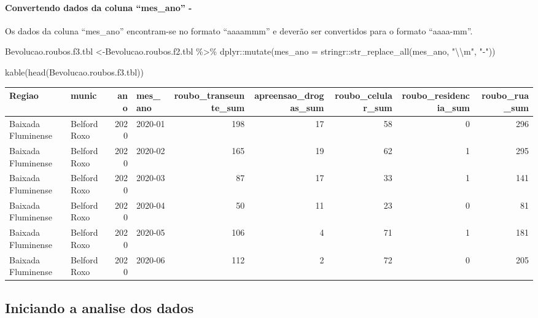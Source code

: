 \documentclass[
]{article}
\newenvironment{Shaded}{\begin{snugshade}}{\end{snugshade}}
\newcommand{\AttributeTok}[1]{\textcolor[rgb]{0.77,0.63,0.00}{#1}}
\newcommand{\FunctionTok}[1]{\textcolor[rgb]{0.00,0.00,0.00}{#1}}
\newcommand{\NormalTok}[1]{#1}
\newcommand{\OtherTok}[1]{\textcolor[rgb]{0.56,0.35,0.01}{#1}}
\newcommand{\SpecialCharTok}[1]{\textcolor[rgb]{0.00,0.00,0.00}{#1}}
\newcommand{\StringTok}[1]{\textcolor[rgb]{0.31,0.60,0.02}{#1}}
\begin{document}
\hypertarget{convertendo-dados-da-coluna-mes_ano--}{%
\paragraph{Convertendo dados da coluna ``mes\_ano'' -}\label{convertendo-dados-da-coluna-mes_ano--}}

Os dados da coluna ``mes\_ano'' encontram-se no formato ``aaaammm'' e deverão ser convertidos para o formato ``aaaa-mm''.

\begin{Shaded}
\begin{Highlighting}[]
\NormalTok{Bevolucao.roubos.f3.tbl }\OtherTok{\textless{}{-}}\NormalTok{Bevolucao.roubos.f2.tbl }\SpecialCharTok{\%\textgreater{}\%}\NormalTok{ dplyr}\SpecialCharTok{::}\FunctionTok{mutate}\NormalTok{(}\AttributeTok{mes\_ano =}\NormalTok{ stringr}\SpecialCharTok{::}\FunctionTok{str\_replace\_all}\NormalTok{(mes\_ano, }\StringTok{"}\SpecialCharTok{\textbackslash{}\textbackslash{}}\StringTok{m"}\NormalTok{, }\StringTok{"{-}"}\NormalTok{))}

\FunctionTok{kable}\NormalTok{(}\FunctionTok{head}\NormalTok{(Bevolucao.roubos.f3.tbl))}
\end{Highlighting}
\end{Shaded}

\begin{tabular}{l|l|r|l|r|r|r|r|r}
\hline
Regiao & munic & ano & mes\_ano & roubo\_transeunte\_sum & apreensao\_drogas\_sum & roubo\_celular\_sum & roubo\_residencia\_sum & roubo\_rua\_sum\\
\hline
Baixada Fluminense & Belford Roxo & 2020 & 2020-01 & 198 & 17 & 58 & 0 & 296\\
\hline
Baixada Fluminense & Belford Roxo & 2020 & 2020-02 & 165 & 19 & 62 & 1 & 295\\
\hline
Baixada Fluminense & Belford Roxo & 2020 & 2020-03 & 87 & 17 & 33 & 1 & 141\\
\hline
Baixada Fluminense & Belford Roxo & 2020 & 2020-04 & 50 & 11 & 23 & 0 & 81\\
\hline
Baixada Fluminense & Belford Roxo & 2020 & 2020-05 & 106 & 4 & 71 & 1 & 181\\
\hline
Baixada Fluminense & Belford Roxo & 2020 & 2020-06 & 112 & 2 & 72 & 0 & 205\\
\hline
\end{tabular}

\hypertarget{iniciando-a-analise-dos-dados}{%
\subsection{Iniciando a analise dos dados}\label{iniciando-a-analise-dos-dados}}
\end{document}
